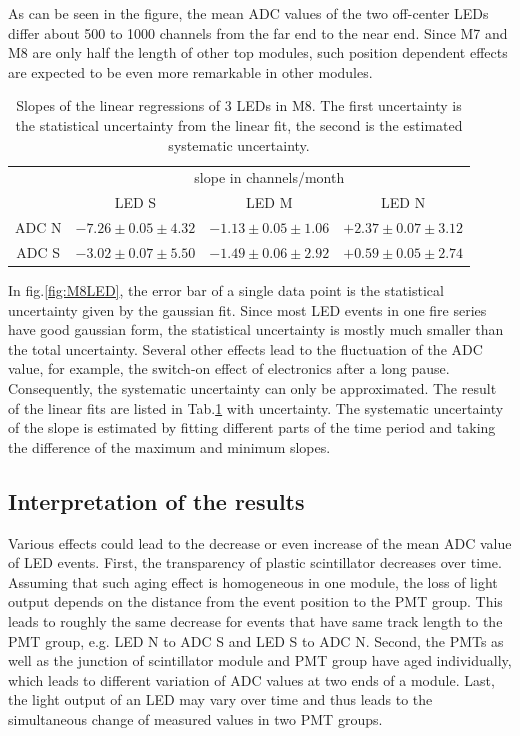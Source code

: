 As can be seen in the figure, the mean ADC values of the two off-center LEDs differ about 500 to 1000 channels from the far end to the near end. Since M7 and M8 are only half the length of other top modules, such position dependent effects are expected to be even more remarkable in other modules.

\begin{table}[hb]
  \centering
  \caption{Slopes of the linear regressions of 3 LEDs in M8. The first uncertainty is the statistical uncertainty from the linear fit, the second is the estimated systematic uncertainty. }
  \label{tab:led}
  \begin{tabular}{c c c c}
  \toprule
        & \multicolumn{3}{c}{slope in channels/month} \\
        & LED S   & LED M  & LED N \\
  \midrule
  ADC N & $-7.26\pm0.05\pm4.32$ & $-1.13\pm0.05\pm1.06$ & $+2.37\pm0.07\pm3.12$  \\
  ADC S & $-3.02\pm0.07\pm5.50$ & $-1.49\pm0.06\pm2.92$ & $+0.59\pm0.05\pm2.74$  \\
  \bottomrule
  \end{tabular}

\end{table}

In fig.\ref{fig:M8LED}, the error bar of a single data point is the statistical uncertainty given by the gaussian fit. Since most LED events in one fire series have good gaussian form, the statistical uncertainty is mostly much smaller than the total uncertainty. Several other effects lead to the fluctuation of the ADC value, for example, the switch-on effect of electronics after a long pause. Consequently, the systematic uncertainty can only be approximated. The result of the linear fits are listed in Tab.\ref{tab:led} with uncertainty. The systematic uncertainty of the slope is estimated by fitting different parts of the time period and taking the difference of the maximum and minimum slopes.

\subsection{Interpretation of the results}


Various effects could lead to the decrease or even increase of the mean ADC value of LED events. First, the transparency of plastic scintillator decreases over time. Assuming that such aging effect is homogeneous in one module, the loss of light output depends on the distance from the event position to the PMT group. This leads to roughly the same decrease for events that have same track length to the PMT group, e.g. LED N to ADC S and LED S to ADC N. Second, the PMTs as well as the junction of scintillator module and PMT group have aged individually, which leads to different variation of ADC values at two ends of a module. Last, the light output of an LED may vary over time and thus leads to the simultaneous change of measured values in two PMT groups.

